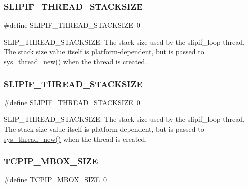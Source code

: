 \subsubsection{\texorpdfstring{S\+L\+I\+P\+I\+F\+\_\+\+T\+H\+R\+E\+A\+D\+\_\+\+S\+T\+A\+C\+K\+S\+I\+ZE}{SLIPIF\_THREAD\_STACKSIZE}\hspace{0.1cm}{\footnotesize\ttfamily [1/2]}}
{\footnotesize\ttfamily \#define S\+L\+I\+P\+I\+F\+\_\+\+T\+H\+R\+E\+A\+D\+\_\+\+S\+T\+A\+C\+K\+S\+I\+ZE~0}

S\+L\+I\+P\+\_\+\+T\+H\+R\+E\+A\+D\+\_\+\+S\+T\+A\+C\+K\+S\+I\+ZE\+: The stack size used by the slipif\+\_\+loop thread. The stack size value itself is platform-\/dependent, but is passed to \hyperlink{group__sys__misc_ga0d596afdd8dbcfad320172d39b0f607a}{sys\+\_\+thread\+\_\+new()} when the thread is created. \mbox{\label{group__lwip__opts__thread_gae8ab54a25007ce997bbab6289815e258}} 
\subsubsection{\texorpdfstring{S\+L\+I\+P\+I\+F\+\_\+\+T\+H\+R\+E\+A\+D\+\_\+\+S\+T\+A\+C\+K\+S\+I\+ZE}{SLIPIF\_THREAD\_STACKSIZE}\hspace{0.1cm}{\footnotesize\ttfamily [2/2]}}
{\footnotesize\ttfamily \#define S\+L\+I\+P\+I\+F\+\_\+\+T\+H\+R\+E\+A\+D\+\_\+\+S\+T\+A\+C\+K\+S\+I\+ZE~0}

S\+L\+I\+P\+\_\+\+T\+H\+R\+E\+A\+D\+\_\+\+S\+T\+A\+C\+K\+S\+I\+ZE\+: The stack size used by the slipif\+\_\+loop thread. The stack size value itself is platform-\/dependent, but is passed to \hyperlink{group__sys__misc_ga0d596afdd8dbcfad320172d39b0f607a}{sys\+\_\+thread\+\_\+new()} when the thread is created. \mbox{\label{group__lwip__opts__thread_ga8cf210ad4e4bf616860a45fbd140fd06}} 
\subsubsection{\texorpdfstring{T\+C\+P\+I\+P\+\_\+\+M\+B\+O\+X\+\_\+\+S\+I\+ZE}{TCPIP\_MBOX\_SIZE}\hspace{0.1cm}{\footnotesize\ttfamily [1/2]}}
{\footnotesize\ttfamily \#define T\+C\+P\+I\+P\+\_\+\+M\+B\+O\+X\+\_\+\+S\+I\+ZE~0}


